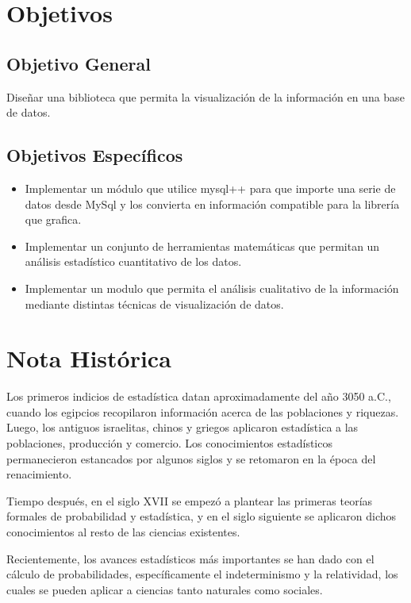 \documentclass[a4paper,titlepage]{article}
\begin{document}
\section{Objetivos}

\subsection{Objetivo General}
Diseñar una biblioteca que permita la visualización de la información en una base de datos.

\subsection{Objetivos Específicos}

\begin{itemize}
\item Implementar un módulo que utilice mysql++ para que importe una serie de datos desde MySql 
      y los convierta en información compatible para la librería que grafica.
\item Implementar un conjunto de herramientas matemáticas que permitan un análisis
	  estadístico cuantitativo de los datos.
\item Implementar un modulo que permita el análisis cualitativo de la información mediante 
	  distintas técnicas de visualización de datos.
\end{itemize}

\section{Nota Histórica}

Los primeros indicios de estadística datan aproximadamente del año 3050 a.C., cuando los
egipcios recopilaron información acerca de las poblaciones y riquezas. Luego, los antiguos
israelitas, chinos y griegos aplicaron estadística a las poblaciones, producción y comercio.
Los conocimientos estadísticos permanecieron estancados por algunos siglos y se retomaron
en la época del renacimiento.

Tiempo después, en el siglo XVII se empezó a plantear las primeras teorías formales de
probabilidad y estadística, y en el siglo siguiente se aplicaron dichos conocimientos al
resto de las ciencias existentes.

Recientemente, los avances estadísticos más importantes se han dado con el cálculo de
probabilidades, específicamente el indeterminismo y la relatividad, los cuales se pueden
aplicar a ciencias tanto naturales como sociales.  
\end{document}
